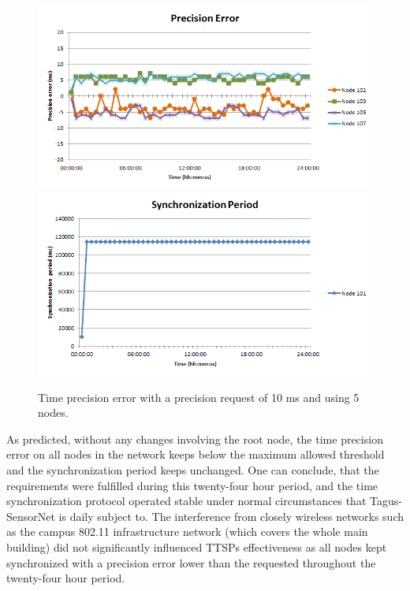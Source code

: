 \begin{figure}[!htb]
\begin{center}
\includegraphics[scale=0.4]{./images/17-ttsp-10ms5nodes-error.png}
\includegraphics[scale=0.4]{./images/18-ttsp-10ms5nodes-period.png}
\end{center}
\caption{Time precision error with a precision request of 10 ms and using 5 nodes.}
\label{24h}
\end{figure}

As predicted, without any changes involving the root node, the time precision error on all nodes in the network keeps below the maximum allowed threshold and the synchronization period keeps unchanged. One can conclude, that the requirements were fulfilled during this twenty-four hour period, and the time synchronization protocol operated stable under normal circumstances that Tagus-SensorNet is daily subject to. The interference from closely wireless networks such as the campus 802.11 infrastructure network (which covers the whole main building) did not significantly influenced TTSPs effectiveness as all nodes kept synchronized with a precision error lower than the requested throughout the twenty-four hour period.